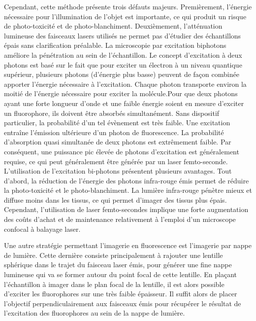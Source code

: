 \documentclass[\main/main.tex]{subfiles}
\begin{document}
%
Cependant, cette méthode présente trois défauts majeurs.
%
Premièrement, l'énergie nécessaire pour l'illumination de l'objet est importante, ce qui produit un risque de photo-toxicité et de photo\hyp{}blanchiment. Deuxièmement, l'atténuation lumineuse des faisceaux lasers utilisés ne permet pas d'étudier des échantillons épais sans clarification préalable.
%
La microscopie par excitation biphotons améliore la pénétration au sein de l'échantillon.
%
Le concept d'excitation à deux photons est basé sur le fait que pour exciter un électron à un niveau quantique supérieur, plusieurs photons (d’énergie plus basse) peuvent de façon combinée apporter l’énergie nécessaire à l’excitation. Chaque photon transporte environ la moitié de l'énergie nécessaire pour exciter la molécule.Pour que deux photons ayant une forte longueur d'onde et une faible énergie soient en mesure d'exciter un fluorophore, ils doivent être absorbés simultanément. Sans dispositif particulier, la probabilité d'un tel évènement est très faible.  Une excitation entraîne l'émission ultérieure d'un photon de fluorescence. La probabilité d'absorption quasi simultanée de deux photons est extrêmement faible. Par conséquent, une puissance pic élevée de photons d'excitation est généralement requise, ce qui peut généralement être générée par un laser femto\hyp{}seconde.
%
L'utilisation de l'excitation bi-photons présentent plusieurs avantages. Tout d'abord, la réduction de l'énergie des photons infra-rouge émis permet de réduire la photo-toxicité et le photo-blanchiment.
%
La lumière infra-rouge pénètre mieux et diffuse moins dans les tissus, ce qui permet d'imager des tissus plus épais.
%
Cependant, l'utilisation de laser femto\hyp{}secondes implique une forte augmentation des coûts d'achat et de maintenance relativement à l'emploi d'un microscope confocal à balayage laser.

\label{sec:spim}
Une autre stratégie permettant l'imagerie en fluorescence est l'imagerie par nappe de lumière\cite{huisken_2004}. Cette dernière consiste principalement à rajouter une lentille sphérique dans le trajet du faisceau laser émis, pour générer une fine nappe lumineuse qui va se former autour du point focal de cette lentille.
%
En plaçant l'échantillon à imager dans le plan focal de la lentille,
il est alors possible d'exciter les fluorophores sur une très faible épaisseur.
%
Il suffit alors de placer l'objectif perpendiculairement aux faisceaux émis pour récupérer le résultat de l'excitation des fluorophores au sein de la nappe de lumière.
\end{document}
